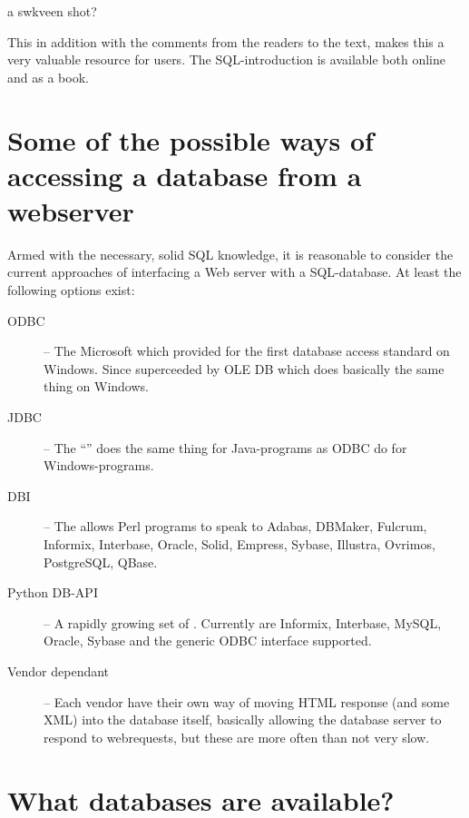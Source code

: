 \textsf{a swkveen shot?}

This in addition with the comments from the readers to the text, makes
this a very valuable resource for users.  The SQL-introduction is
available both online and as a book.


\section{Some of the possible ways of accessing a database from a webserver}
\label{sec:accessing-a-database-from-a-webserver}

Armed with the necessary, solid SQL knowledge, it is reasonable to
consider the current approaches of interfacing a Web server with a
SQL-database.  At least the following options exist:

\begin{description}
\item[ODBC] -- The Microsoft  which
  provided for the first database access standard on Windows.  Since
  superceeded by OLE DB which does basically the same thing on Windows.
\item[JDBC] -- The ``'' does the same thing for Java-programs as ODBC do for
  Windows-programs.
\item[DBI] -- The 
  allows Perl programs to speak to Adabas, DBMaker, Fulcrum, Informix,
  Interbase, Oracle, Solid, Empress, Sybase, Illustra, Ovrimos,
  PostgreSQL, QBase.
\item[Python DB-API] -- A rapidly growing set of
  .  Currently are Informix, Interbase,
  MySQL, Oracle, Sybase and the generic ODBC interface supported.
\item[Vendor dependant] -- Each vendor have their own way of moving
  HTML response (and some XML) into the database itself, basically
  allowing the database server to respond to webrequests, but these are
  more often than not very slow.

  
\end{description}


\section{What databases are available?}
\label{sec:what-databases-are-available}


